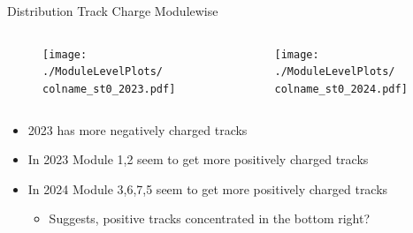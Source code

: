 \begin{frame}{Distribution Track Charge Modulewise}
    \newcommand{\colname}{Track_charge}
    \begin{columns}
        \begin{column}{0.6\linewidth}
            \begin{figure}
                \centering
                \texttt{[image: ./ModuleLevelPlots/\\colname\_st0\_2023.pdf]}
            \end{figure}
        \end{column}
        \begin{column}{0.6\linewidth}
            \begin{figure}
                \centering
                \texttt{[image: ./ModuleLevelPlots/\\colname\_st0\_2024.pdf]}
            \end{figure}
        \end{column}
    \end{columns}

    \begin{itemize}
        \small
        \item 2023 has more negatively charged tracks
        \item In 2023 Module 1,2 seem to get more positively charged tracks
        \item In 2024 Module 3,6,7,5 seem to get more positively charged tracks
        \begin{itemize}
            \item Suggests, positive tracks concentrated in the bottom right?
        \end{itemize}
    \end{itemize}
\end{frame}


